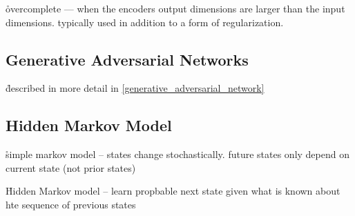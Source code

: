 \r{overcomplete --- when the encoders output dimensions are larger than the input dimensions. typically used in addition to a form of regularization.}




\subsection{Generative Adversarial Networks}

\r{described in more detail in \ref{generative_adversarial_network}}

\subsection{Hidden Markov Model}

\r{simple markov model -- states change stochastically. future states only depend on current state (not prior states)}

\r{Hidden Markov model -- learn propbable next state given what is known about hte sequence of previous states}